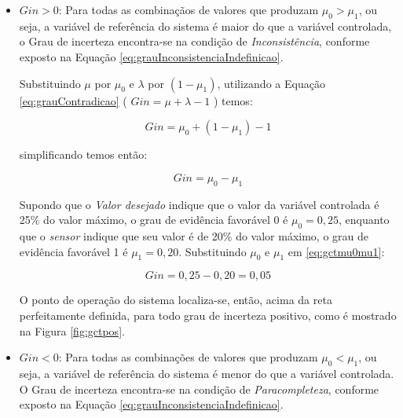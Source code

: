 \begin{itemize}
\item $Gin > 0 $: 
Para todas as combinaçãos de valores que produzam 
$\mu_0 > \mu_1$, 
ou seja, a variável de referência do sistema é 
maior do que a variável controlada,
o Grau de incerteza encontra-se na condição de 
\textit{Inconsistência}, conforme exposto na Equação 
\ref{eq:grauInconsistenciaIndefinicao}.

Substituindo $\mu$ por $\mu_0$ e 
$\lambda$ por $(1-\mu_1)$, 
utilizando a Equação \ref{eq:grauContradicao} 
( $Gin = \mu + \lambda - 1 $ )
temos:



\begin{equation}%
Gin = \mu_0 + (1-\mu_1) -1
\end{equation}%



simplificando temos então:



\begin{equation}%
Gin = \mu_0 - \mu_1
\label{eq:gctmu0mu1}
\end{equation}%



Supondo que o \emph{Valor desejado} indique que 
o valor da variável controlada é 25\% do valor máximo, 
o grau de evidência favorável 0 é $\mu_0 = 0,25$, 
enquanto que o \emph{sensor} indique que 
seu valor é de 20\% do valor máximo, 
o grau de evidência favorável 1 é $\mu_1 = 0,20$. 
Substituindo $\mu_0$ e $\mu_1$ em \ref{eq:gctmu0mu1}:



\begin{equation}%
Gin = 0,25 - 0,20 = 0,05
\end{equation}%



O ponto de operação do sistema 
localiza-se, então, acima da reta perfeitamente definida,
para todo grau de incerteza positivo, 
como é mostrado na Figura \ref{fig:gctpos}.



\item $Gin < 0 $: 
Para todas as combinações de valores que produzam 
$\mu_0 < \mu_1$, 
ou seja, a variável de referência do sistema é 
menor do que a variável controlada. 
O Grau de incerteza encontra-se na condição de 
\textit{Paracompleteza}, conforme exposto na Equação 
\ref{eq:grauInconsistenciaIndefinicao}.


\end{itemize}
